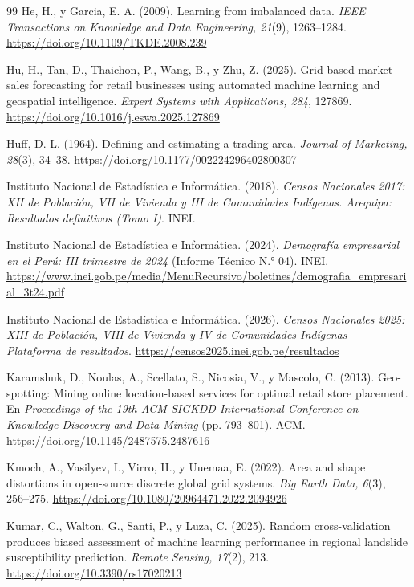 \documentclass[10pt,letterpaper,twocolumn]{article}
\begin{document}
\begin{thebibliography}{99}
 He, H., y Garcia, E. A. (2009). Learning from imbalanced data. \textit{IEEE Transactions on Knowledge and Data Engineering, 21}(9), 1263--1284. \url{https://doi.org/10.1109/TKDE.2008.239}

 Hu, H., Tan, D., Thaichon, P., Wang, B., y Zhu, Z. (2025). Grid-based market sales forecasting for retail businesses using automated machine learning and geospatial intelligence. \textit{Expert Systems with Applications, 284}, 127869. \url{https://doi.org/10.1016/j.eswa.2025.127869}

 Huff, D. L. (1964). Defining and estimating a trading area. \textit{Journal of Marketing, 28}(3), 34--38. \url{https://doi.org/10.1177/002224296402800307}

 Instituto Nacional de Estadística e Informática. (2018). \textit{Censos Nacionales 2017: XII de Población, VII de Vivienda y III de Comunidades Indígenas. Arequipa: Resultados definitivos (Tomo I)}. INEI.

 Instituto Nacional de Estadística e Informática. (2024). \textit{Demografía empresarial en el Perú: III trimestre de 2024} (Informe Técnico N.° 04). INEI. \url{https://www.inei.gob.pe/media/MenuRecursivo/boletines/demografia_empresarial_3t24.pdf}

 Instituto Nacional de Estadística e Informática. (2026). \textit{Censos Nacionales 2025: XIII de Población, VIII de Vivienda y IV de Comunidades Indígenas -- Plataforma de resultados}. \url{https://censos2025.inei.gob.pe/resultados}

 Karamshuk, D., Noulas, A., Scellato, S., Nicosia, V., y Mascolo, C. (2013). Geo-spotting: Mining online location-based services for optimal retail store placement. En \textit{Proceedings of the 19th ACM SIGKDD International Conference on Knowledge Discovery and Data Mining} (pp. 793--801). ACM. \url{https://doi.org/10.1145/2487575.2487616}

 Kmoch, A., Vasilyev, I., Virro, H., y Uuemaa, E. (2022). Area and shape distortions in open-source discrete global grid systems. \textit{Big Earth Data, 6}(3), 256--275. \url{https://doi.org/10.1080/20964471.2022.2094926}

 Kumar, C., Walton, G., Santi, P., y Luza, C. (2025). Random cross-validation produces biased assessment of machine learning performance in regional landslide susceptibility prediction. \textit{Remote Sensing, 17}(2), 213. \url{https://doi.org/10.3390/rs17020213}


\end{thebibliography}
\end{document}

